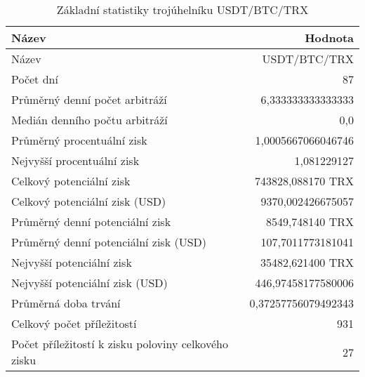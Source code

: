 \begin{table}\centering
\caption{Základní statistiky trojúhelníku USDT/BTC/TRX}
\label{USDTBTCTRX_stats}
\begin{tabular}{|| l | r ||}
\hline Název & Hodnota \\ 
\hline\hline Název & USDT/BTC/TRX \\ 
\hline Počet dní & 87 \\ 
\hline Průměrný denní počet arbitráží & 6,333333333333333 \\ 
\hline Medián denního počtu arbitráží & 0,0 \\ 
\hline Průměrný procentuální zisk & 1,0005667066046746 \\ 
\hline Nejvyšší procentuální zisk & 1,081229127 \\ 
\hline Celkový potenciální zisk & 743828,088170 TRX \\ 
\hline Celkový potenciální zisk (USD) & 9370,002426675057 \\ 
\hline Průměrný denní potenciální zisk & 8549,748140 TRX \\ 
\hline Průměrný denní potenciální zisk (USD) & 107,7011773181041 \\ 
\hline Nejvyšší potenciální zisk & 35482,621400 TRX \\ 
\hline Nejvyšší potenciální zisk (USD) & 446,97458177580006 \\ 
\hline Průměrná doba trvání & 0,37257756079492343 \\ 
\hline Celkový počet příležitostí & 931 \\ 
\hline Počet příležitostí k zisku poloviny celkového zisku & 27 \\ 
\hline
\end{tabular}
\end{table}
